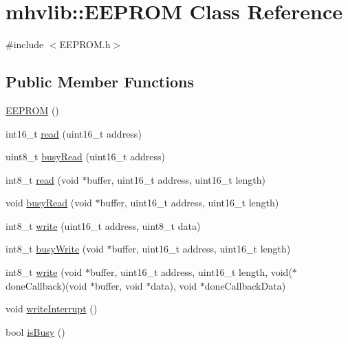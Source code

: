 \hypertarget{classmhvlib_1_1_e_e_p_r_o_m}{\section{mhvlib\-:\-:E\-E\-P\-R\-O\-M Class Reference}
\label{classmhvlib_1_1_e_e_p_r_o_m}
}


{\ttfamily \#include $<$E\-E\-P\-R\-O\-M.\-h$>$}

\subsection*{Public Member Functions}
\begin{DoxyCompactItemize}
\item 
\hyperlink{classmhvlib_1_1_e_e_p_r_o_m_adb83b14d67eaf89756cb430bb3875a08}{E\-E\-P\-R\-O\-M} ()
\item 
int16\-\_\-t \hyperlink{classmhvlib_1_1_e_e_p_r_o_m_aa80923ec60ff6b31fc2198b942d1c7eb}{read} (uint16\-\_\-t address)
\item 
uint8\-\_\-t \hyperlink{classmhvlib_1_1_e_e_p_r_o_m_ac66458bbafbc01f44049b3eea5275f12}{busy\-Read} (uint16\-\_\-t address)
\item 
int8\-\_\-t \hyperlink{classmhvlib_1_1_e_e_p_r_o_m_a64962d33ab18cf1c884af508da498438}{read} (void $\ast$buffer, uint16\-\_\-t address, uint16\-\_\-t length)
\item 
void \hyperlink{classmhvlib_1_1_e_e_p_r_o_m_a90f74eb2d977331a77b86d2ae93af21a}{busy\-Read} (void $\ast$buffer, uint16\-\_\-t address, uint16\-\_\-t length)
\item 
int8\-\_\-t \hyperlink{classmhvlib_1_1_e_e_p_r_o_m_af2e6ca3e64774fba74bbc6c3dc31e193}{write} (uint16\-\_\-t address, uint8\-\_\-t data)
\item 
int8\-\_\-t \hyperlink{classmhvlib_1_1_e_e_p_r_o_m_a51fd372faf5f9fe5c425646d9f97e0e8}{busy\-Write} (void $\ast$buffer, uint16\-\_\-t address, uint16\-\_\-t length)
\item 
int8\-\_\-t \hyperlink{classmhvlib_1_1_e_e_p_r_o_m_af901921bc9b36044117f4695cc0178b0}{write} (void $\ast$buffer, uint16\-\_\-t address, uint16\-\_\-t length, void($\ast$done\-Callback)(void $\ast$buffer, void $\ast$data), void $\ast$done\-Callback\-Data)
\item 
void \hyperlink{classmhvlib_1_1_e_e_p_r_o_m_a66b70503b83a26fd99c4377f9a49670e}{write\-Interrupt} ()
\item 
bool \hyperlink{classmhvlib_1_1_e_e_p_r_o_m_a2380b1457aa996eb905b4fc3cbb9702b}{is\-Busy} ()
\end{DoxyCompactItemize}



